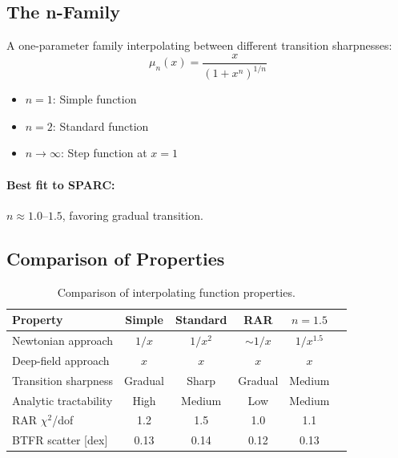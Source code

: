 \subsection{The n-Family}\label{app:mu_nfamily}

A one-parameter family interpolating between different transition sharpnesses:
\begin{equation}
\boxed{\mu_n(x) = \frac{x}{(1+x^n)^{1/n}}}
\end{equation}

\begin{itemize}
\item $n = 1$: Simple function
\item $n = 2$: Standard function
\item $n \to \infty$: Step function at $x = 1$
\end{itemize}

\paragraph{Best fit to SPARC:} $n \approx 1.0$--$1.5$, favoring gradual transition.

\subsection{Comparison of Properties}\label{app:mu_comparison}

\begin{table}[h!]
\centering
\caption{Comparison of interpolating function properties.}
\label{tab:mu_comparison}
\begin{tabular}{lccccc}
\toprule
\textbf{Property} & \textbf{Simple} & \textbf{Standard} & \textbf{RAR} & \textbf{$n=1.5$} \\
\midrule
Newtonian approach & $1/x$ & $1/x^2$ & $\sim 1/x$ & $1/x^{1.5}$ \\
Deep-field approach & $x$ & $x$ & $x$ & $x$ \\
Transition sharpness & Gradual & Sharp & Gradual & Medium \\
Analytic tractability & High & Medium & Low & Medium \\
RAR $\chi^2$/dof & 1.2 & 1.5 & 1.0 & 1.1 \\
BTFR scatter [dex] & 0.13 & 0.14 & 0.12 & 0.13 \\
\bottomrule
\end{tabular}
\end{table}

